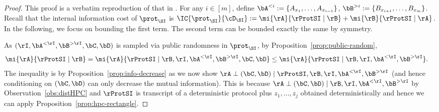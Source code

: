\begin{proof}
This proof is a verbatim reproduction of that in \cite{AssadiCK19}. For any $i \in [m]$, define $\bA^{<i} := \{A_{x_1},\ldots,A_{x_{i-1}}\}$, $\bB^{>i} := \{B_{x_{i+1}},\ldots,B_{x_{m}}\}$. Recall that 
the internal information cost of $\prot_\SI$ is $\IC{\prot_\SI}{\cD_\SI} := \mi{\rA}{\rProtSI \mid \rB} + \mi{\rB}{\rProtSI \mid \rA}$. In the following, we focus on bounding the first term. The second term can be bounded exactly
the same by symmetry.  

As $(\rI,\bA^{<\rI},\bB^{>\rI},\bC,\bD)$ is sampled via public randomness in $\prot_\SI$, by Proposition~\ref{prop:public-random},   
\begin{align*}
	\mi{\rA}{\rProtSI \mid \rB} &= \mi{\rA}{\rProtSI \mid \rB, \rI,\bA^{<\rI},\bB^{>\rI},\bC,\bD} \leq \mi{\rA}{\rProtSI \mid \rB, \rI,\bA^{<\rI},\bB^{>\rI}}. 
\end{align*}
The inequality is by Proposition~\ref{prop:info-decrease} as we now show $\rA \perp (\bC,\bD) \mid \rProtSI,\rB,\rI,\bA^{<\rI},\bB^{>\rI}$ (and hence conditioning on $(\bC,\bD)$ can only decrease the mutual information). 
This is because $\rA \perp (\bC,\bD) \mid \rB,\rI,\bA^{<\rI},\bB^{>\rI}$ by Observation~\ref{obs:distHPC} and $\rProtSI$ is transcript of a deterministic protocol plus $z_1,\ldots,z_j$ obtained deterministically and hence we can apply
Proposition~\ref{prop:hpc-rectangle}.  


\end{proof}
